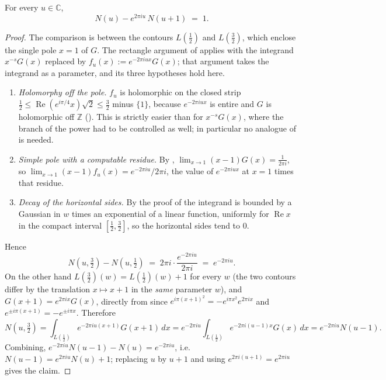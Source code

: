 \begin{lemma}
\label{lem:rsz_mordell_pole}
\leanok
{}
For every $u\in\mathbb{C}$,
\[
  N(u)-e^{2\pi iu}\,N(u+1)\;=\;1 .
\]
\end{lemma}

\begin{proof}
\leanok
{}
The comparison is between the contours $L(\tfrac12)$ and $L(\tfrac32)$, which enclose the
single pole $x=1$ of $G$.  The rectangle argument of  applies with the
integrand $x^{-s}G(x)$ replaced by $f_{u}(x):=e^{-2\pi iux}G(x)$; that argument takes the
integrand as a parameter, and its three hypotheses hold here.
\begin{enumerate}
  \item \emph{Holomorphy off the pole.}  $f_{u}$ is holomorphic on the closed strip
        $\tfrac12\le\operatorname{Re}(e^{i\pi/4}x)\sqrt2\le\tfrac32$ minus $\{1\}$, because
        $e^{-2\pi iux}$ is entire and $G$ is holomorphic off $\mathbb{Z}$
        ().  This is strictly easier than for $x^{-s}G(x)$, where
        the branch of the power had to be controlled as well; in particular no analogue of
         is needed.
  \item \emph{Simple pole with a computable residue.}  By ,
        $\lim_{x\to1}(x-1)G(x)=\tfrac1{2\pi i}$, so
        $\lim_{x\to1}(x-1)f_{u}(x)=e^{-2\pi iu}/2\pi i$, the value of $e^{-2\pi iux}$ at
        $x=1$ times that residue.
  \item \emph{Decay of the horizontal sides.}  By the proof of 
        the integrand is bounded by a Gaussian in $w$ times an exponential of a linear
        function, uniformly for $\operatorname{Re}x$ in the compact interval
        $[\tfrac12,\tfrac32]$, so the horizontal sides tend to $0$.
\end{enumerate}
Hence
\[
  N(u,\tfrac32)-N(u,\tfrac12)\;=\;2\pi i\cdot\frac{e^{-2\pi iu}}{2\pi i}\;=\;e^{-2\pi iu}.
\]
On the other hand $L(\tfrac32)(w)=L(\tfrac12)(w)+1$ for every $w$ (the two contours differ
by the translation $x\mapsto x+1$ in the \emph{same} parameter $w$), and $G(x+1)=e^{2\pi ix}G(x)$, directly from  since
$e^{i\pi(x+1)^{2}}=-e^{i\pi x^{2}}e^{2\pi ix}$ and $e^{\pm i\pi(x+1)}=-e^{\pm i\pi x}$.
Therefore
\[
  N(u,\tfrac32)=\int_{L(\frac12)}e^{-2\pi iu(x+1)}G(x+1)\,dx
    =e^{-2\pi iu}\int_{L(\frac12)}e^{-2\pi i(u-1)x}G(x)\,dx=e^{-2\pi iu}N(u-1).
\]
Combining, $e^{-2\pi iu}N(u-1)-N(u)=e^{-2\pi iu}$, i.e.\ $N(u-1)=e^{2\pi iu}N(u)+1$;
replacing $u$ by $u+1$ and using $e^{2\pi i(u+1)}=e^{2\pi iu}$ gives the claim.
\end{proof}

